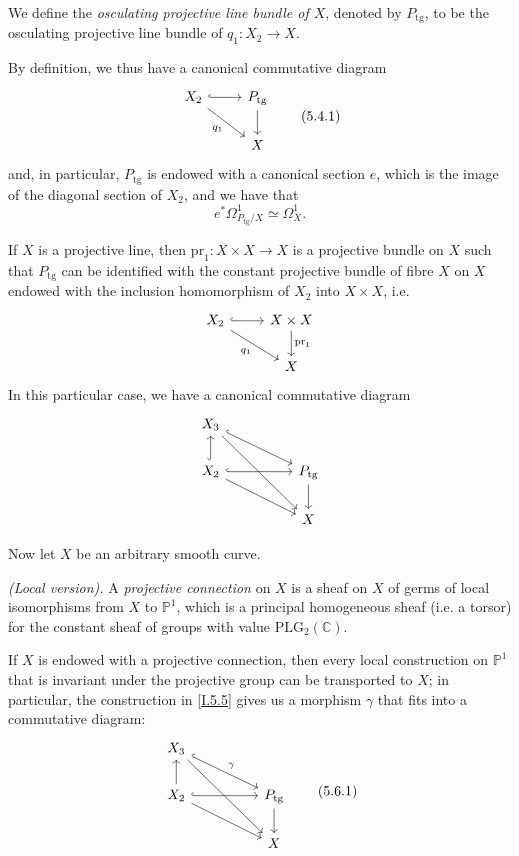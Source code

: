 \documentclass{report}
\theoremstyle{plain}
\theoremstyle{definition}
\newenvironment{definition}[1]
    {\renewcommand\theinnercustomdefinition{#1}\innercustomdefinition}
    {\endinnercustomdefinition}
\newenvironment{env}[1]
    {\renewcommand\theinnercustomenv{#1}\innercustomenv}
    {\endinnercustomenv}
\newcommand{\PP}{\mathbb{P}}
\newcommand{\CC}{\mathbb{C}}
\newcommand{\pr}{\mathrm{pr}}
\newcommand{\tg}{\mathrm{tg}}
\newcommand{\oldpage}[1]{\marginpar{\footnotesize$\Big\vert$ \textit{p.~#1}}}
\begin{document}
\begin{definition}{5.4}
\label{I.5.4}
  We define the \emph{osculating projective line bundle of $X$}, denoted by $P_\tg$, to be the osculating projective line bundle of $q_1\colon X_2\to X$.
\end{definition}

By definition, we thus have a canonical commutative diagram
\[
\label{I.5.4.1}
  \begin{tikzcd}
    X_2 \rar[hook] \drar[swap,"q_1"]
    & P_\tg \dar
  \\& X
  \end{tikzcd}
\tag{5.4.1}
\]
and, in particular, $P_\tg$ is endowed with a canonical section $e$, which is the image of the diagonal section of $X_2$, and we have that
\[
\label{I.5.4.2}
  e^*\Omega_{P_\tg/X}^1 \simeq \Omega_X^1.
\tag{5.4.2}
\]

\begin{env}{5.5}
\label{I.5.5}
  If $X$ is a projective line, then $\pr_1\colon X\times X\to X$ is a projective bundle on $X$ such that $P_\tg$ can be identified with the constant projective bundle of fibre $X$ on $X$ endowed with the inclusion homomorphism of $X_2$ into $X\times X$, i.e.
  \[
    \begin{tikzcd}
      X_2 \rar[hook] \drar[swap,"q_1"]
      & X\times X \dar["\pr_1"]
    \\& X
    \end{tikzcd}
  \]
\oldpage{31}
  In this particular case, we have a canonical commutative diagram
  \[
    \begin{tikzcd}[column sep=huge]
      X_3 \drar[hook] \ar[ddr]
    \\X_2 \uar[hook] \rar[hook] \drar
      & P_\tg \dar
    \\& X
    \end{tikzcd}
  \]
\end{env}

Now let $X$ be an arbitrary smooth curve.

\begin{definition}{5.6}
\label{I.5.6}
  \emph{(Local version).}
  A \emph{projective connection} on $X$ is a sheaf on $X$ of germs of local isomorphisms from $X$ to $\PP^1$, which is a principal homogeneous sheaf (i.e. a torsor) for the constant sheaf of groups with value $\mathrm{PLG}_2(\CC)$.
\end{definition}

If $X$ is endowed with a projective connection, then every local construction on $\PP^1$ that is invariant under the projective group can be transported to $X$;
in particular, the construction in \cref{I.5.5} gives us a morphism $\gamma$ that fits into a commutative diagram:
\[
\label{I.5.6.1}
  \begin{tikzcd}[column sep=huge]
    X_3 \drar[hook,"\gamma"] \ar[ddr]
  \\X_2 \uar \rar[hook] \drar
    & P_\tg \dar
  \\& X
  \end{tikzcd}
\tag{5.6.1}
\]
\end{document}
